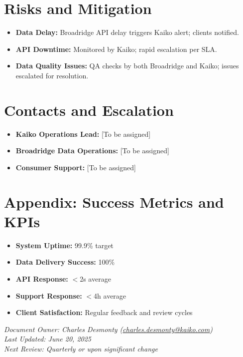 \documentclass[12pt,a4paper]{article}
\begin{document}
\section{Risks and Mitigation}

\begin{itemize}[leftmargin=*]
    \item \textbf{Data Delay:} Broadridge API delay triggers Kaiko alert; clients notified.
    \item \textbf{API Downtime:} Monitored by Kaiko; rapid escalation per SLA.
    \item \textbf{Data Quality Issues:} QA checks by both Broadridge and Kaiko; issues escalated for resolution.
\end{itemize}

\section{Contacts and Escalation}

\begin{itemize}[leftmargin=*]
    \item \textbf{Kaiko Operations Lead:} [To be assigned]
    \item \textbf{Broadridge Data Operations:} [To be assigned]
    \item \textbf{Consumer Support:} [To be assigned]
\end{itemize}

\section{Appendix: Success Metrics and KPIs}

\begin{itemize}[leftmargin=*]
    \item \textbf{System Uptime:} 99.9\% target
    \item \textbf{Data Delivery Success:} 100\%
    \item \textbf{API Response:} $<$2s average
    \item \textbf{Support Response:} $<$4h average
    \item \textbf{Client Satisfaction:} Regular feedback and review cycles
\end{itemize}

\vspace{1em}
\noindent\textit{Document Owner: Charles Desmonty (\href{mailto:charles.desmonty@kaiko.com}{charles.desmonty@kaiko.com}) \\
Last Updated: June 20, 2025 \\
Next Review: Quarterly or upon significant change}
\end{document}
